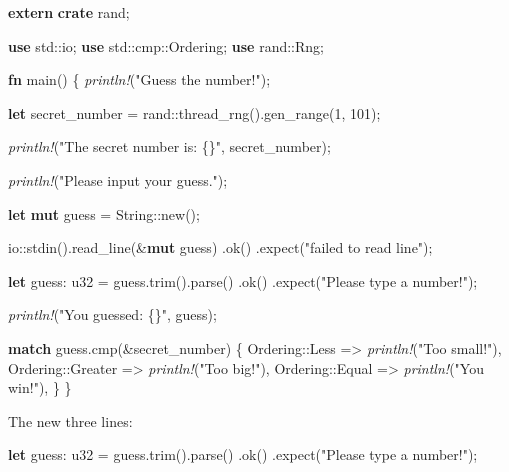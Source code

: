 \documentclass[a4paper,]{book}
\newenvironment{Shaded}{\begin{snugshade}}{\end{snugshade}}
\newcommand{\KeywordTok}[1]{\textcolor[rgb]{0.13,0.29,0.53}{\textbf{{#1}}}}
\newcommand{\DataTypeTok}[1]{\textcolor[rgb]{0.13,0.29,0.53}{{#1}}}
\newcommand{\DecValTok}[1]{\textcolor[rgb]{0.00,0.00,0.81}{{#1}}}
\newcommand{\StringTok}[1]{\textcolor[rgb]{0.31,0.60,0.02}{{#1}}}
\newcommand{\PreprocessorTok}[1]{\textcolor[rgb]{0.56,0.35,0.01}{\textit{{#1}}}}
\newcommand{\NormalTok}[1]{{#1}}
\begin{document}
\begin{Shaded}
\begin{Highlighting}[]
\KeywordTok{extern} \KeywordTok{crate} \NormalTok{rand;}

\KeywordTok{use} \NormalTok{std::io;}
\KeywordTok{use} \NormalTok{std::cmp::Ordering;}
\KeywordTok{use} \NormalTok{rand::Rng;}

\KeywordTok{fn} \NormalTok{main() \{}
    \PreprocessorTok{println!}\NormalTok{(}\StringTok{"Guess the number!"}\NormalTok{);}

    \KeywordTok{let} \NormalTok{secret_number = rand::thread_rng().gen_range(}\DecValTok{1}\NormalTok{, }\DecValTok{101}\NormalTok{);}

    \PreprocessorTok{println!}\NormalTok{(}\StringTok{"The secret number is: \{\}"}\NormalTok{, secret_number);}

    \PreprocessorTok{println!}\NormalTok{(}\StringTok{"Please input your guess."}\NormalTok{);}

    \KeywordTok{let} \KeywordTok{mut} \NormalTok{guess = }\DataTypeTok{String}\NormalTok{::new();}

    \NormalTok{io::stdin().read_line(&}\KeywordTok{mut} \NormalTok{guess)}
        \NormalTok{.ok()}
        \NormalTok{.expect(}\StringTok{"failed to read line"}\NormalTok{);}

    \KeywordTok{let} \NormalTok{guess: }\DataTypeTok{u32} \NormalTok{= guess.trim().parse()}
        \NormalTok{.ok()}
        \NormalTok{.expect(}\StringTok{"Please type a number!"}\NormalTok{);}

    \PreprocessorTok{println!}\NormalTok{(}\StringTok{"You guessed: \{\}"}\NormalTok{, guess);}

    \KeywordTok{match} \NormalTok{guess.cmp(&secret_number) \{}
        \NormalTok{Ordering::Less    => }\PreprocessorTok{println!}\NormalTok{(}\StringTok{"Too small!"}\NormalTok{),}
        \NormalTok{Ordering::Greater => }\PreprocessorTok{println!}\NormalTok{(}\StringTok{"Too big!"}\NormalTok{),}
        \NormalTok{Ordering::Equal   => }\PreprocessorTok{println!}\NormalTok{(}\StringTok{"You win!"}\NormalTok{),}
    \NormalTok{\}}
\NormalTok{\}}
\end{Highlighting}
\end{Shaded}

The new three lines:

\begin{Shaded}
\begin{Highlighting}[]
    \KeywordTok{let} \NormalTok{guess: }\DataTypeTok{u32} \NormalTok{= guess.trim().parse()}
        \NormalTok{.ok()}
        \NormalTok{.expect(}\StringTok{"Please type a number!"}\NormalTok{);}
\end{Highlighting}
\end{Shaded}
\end{document}
